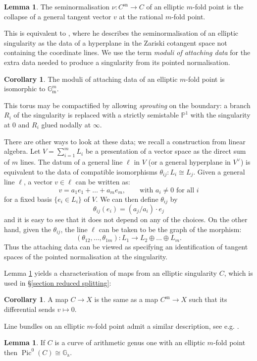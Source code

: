 \documentclass[11pt]{amsart}
\newcommand{\PP}{\mathbb P}
\renewcommand{\to}{\rightarrow}
\theoremstyle{definition}
\newtheorem{lemma}[thm]{Lemma}
\newtheorem{cor}[thm]{Corollary}
\theoremstyle{definition}
\begin{document}
\begin{lemma}\label{lem:pushout}
 The seminormalisation $\nu\colon C^\text{sn}\to C$ of an elliptic $m$-fold point is the collapse of a general tangent vector $v$ at the rational $m$-fold point.
\end{lemma}

\noindent This is equivalent to \cite[Lemma 2.2]{SMY1}, where he describes the seminormalisation of an elliptic singularity as the data of a hyperplane in the Zariski cotangent space not containing the coordinate lines. We use the term \emph{moduli of attaching data} \cite[\S 2.2]{SMY2} for the extra data needed to produce a singularity from its pointed normalisation.

\begin{cor}
 The moduli of attaching data of an elliptic $m$-fold point is isomorphic to $\mathbb G_{\text{m}}^m$.
\end{cor}
\noindent This torus may be compactified by allowing \emph{sprouting} on the boundary: a branch $R_i$ of the singularity is replaced with a strictly semistable $\PP^1$ with the singularity at $0$ and $R_i$ glued nodally at $\infty$.

There are other ways to look at these data; we recall a construction from linear algebra. Let $V=\sum_{i=1}^mL_i$ be a presentation of a vector space as the direct sum of $m$ lines. The datum of a general line $\ell$ in $V$ (or a general hyperplane in $V^\vee$) is equivalent to the data of compatible isomorphisms $\theta_{ij} \colon L_i \cong L_j$. Given a general line $\ell$, a vector $v\in\ell$ can be written as:
\[v=a_1e_1+\ldots+a_me_m,\qquad \text{with $a_i\neq 0$ for all $i$}\]
for a fixed basis $\{e_i\in L_i\}$ of $V$. We can then define $\theta_{ij}$ by
\[\theta_{ij}(e_i)=(a_j/a_i)\cdot e_j\]
and it is easy to see that it does not depend on any of the choices. On the other hand, given the $\theta_{ij}$, the line $\ell$ can be taken to be the graph of the morphism:
\[(\theta_{12},\ldots,\theta_{1m})\colon L_1\to L_2\oplus\ldots\oplus L_m.\]
Thus the attaching data can be viewed as specifying an identification of tangent spaces of the pointed normalisation at the singularity.

Lemma \ref{lem:pushout} yields a characterisation of maps from an elliptic singularity $C$, which is used in \S \ref{section reduced splitting}:
\begin{cor}\label{cor:maps_from_elliptic_sing}
 A map $C\to X$ is the same as a map $C^\text{sn}\to X$ such that its differential sends $v \mapsto 0$.
\end{cor}
\noindent Line bundles on an elliptic $m$-fold point admit a similar description, see e.g. \cite[Lemma 7.5.12]{LiuQ}.
\begin{lemma}\label{lem:PicE}
 If $C$ is a curve of arithmetic genus one with an elliptic $m$-fold point then $\operatorname{Pic}^0(C)\cong\mathbb G_{\text{a}}$.
\end{lemma}
\end{document}
